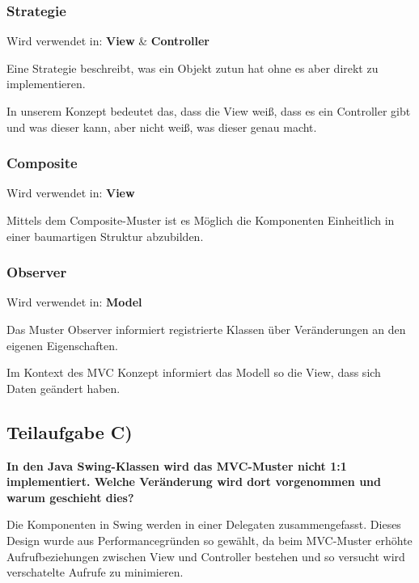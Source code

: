\subsubsection{Strategie}
Wird verwendet in: \textbf{View} \& \textbf{Controller}

Eine Strategie beschreibt, was ein Objekt zutun hat ohne es aber direkt zu
implementieren. 

In unserem Konzept bedeutet das, dass die View weiß, dass es ein Controller gibt
und was dieser kann, aber nicht weiß, was dieser genau macht.

\subsubsection{Composite}
Wird verwendet in: \textbf{View}

Mittels dem Composite-Muster ist es Möglich die Komponenten Einheitlich in einer
baumartigen Struktur abzubilden.

\subsubsection{Observer}
Wird verwendet in: \textbf{Model}

Das Muster Observer informiert registrierte Klassen über Veränderungen an den
eigenen Eigenschaften.

Im Kontext des MVC Konzept informiert das Modell so die View, dass sich Daten
geändert haben.

\subsection{Teilaufgabe C)}
\textbf{In den Java Swing-Klassen wird das MVC-Muster nicht 1:1 implementiert. Welche
Veränderung wird dort vorgenommen und warum geschieht dies?}

Die Komponenten in Swing werden in einer Delegaten zusammengefasst.
Dieses Design wurde aus Performancegründen so gewählt, da beim MVC-Muster
erhöhte Aufrufbeziehungen zwischen View und Controller bestehen und so versucht
wird verschatelte Aufrufe zu minimieren.

\clearpage
